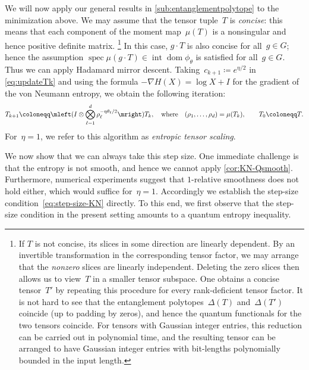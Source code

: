 \documentclass[11pt,letterpaper]{article}
\numberwithin{equation}{section}
\DeclareMathOperator{\intr}{int}
\DeclareMathOperator{\dom}{dom}
\DeclareMathOperator{\spec}{spec}
\begin{document}
We will now apply our general results in \cref{sub:entanglementpolytope} to the minimization above.
We may assume that the tensor tuple~$T$ is \emph{concise}: this means that each component of the moment map~$\mu(T)$ is a nonsingular and hence positive definite matrix.%
\footnote{\label{footnote:concise}If $T$ is not concise, its slices in some direction are linearly dependent.
By an invertible transformation in the corresponding tensor factor, we may arrange that the \emph{nonzero} slices are linearly independent.
Deleting the zero slices then allows us to view~$T$ in a smaller tensor subspace.
One obtains a concise tensor~$T'$ by repeating this procedure for every rank-deficient tensor factor.
It is not hard to see that the entanglement polytopes~$\Delta(T)$ and~$\Delta(T')$ coincide (up to padding by zeros), and hence the quantum functionals for the two tensors coincide.
For tensors with Gaussian integer entries, this reduction can be carried out in polynomial time, and the resulting tensor can be arranged to have Gaussian integer entries with bit-lengths polynomially bounded in the input length.}
In this case, $g \cdot T$ is also concise for all~$g \in G$; hence the assumption $\spec\mu(g \cdot T) \in \intr \dom \phi_\theta$ is satisfied for all~$g \in G$.
Thus we can apply Hadamard mirror descent.
Taking~$c_{k+1} \coloneqq e^{\eta/2}$ in \cref{eq:updateTk} and using the formula $-\nabla H(X) = \log X + I$ for the gradient of the von Neumann entropy, we obtain the following iteration:
\begin{align}\label{eq:entropic tensor scaling}
    T_{k+1}
\coloneqq \mleft(I \otimes \bigotimes_{\ell=1}^d \rho_\ell^{-\eta \theta_\ell/2}\mright)T_k,
    \quad\text{where}\quad (\rho_1,\dots,\rho_d) = \mu(T_k),\qquad T_0 \coloneqq T.
\end{align}
For~$\eta=1$, we refer to this algorithm as \emph{entropic tensor scaling}.

We now show that we can always take this step size.
One immediate challenge is that the entropy is not smooth, and hence we cannot apply \cref{cor:KN-Qsmooth}.
Furthermore, numerical experiments suggest that $1$-relative smoothness does not hold either, which would suffice for~$\eta=1$.
Accordingly we establish the step-size condition~\eqref{eq:step-size-KN} directly.
To this end, we first observe that the step-size condition in the present setting amounts to a quantum entropy inequality.
\end{document}
